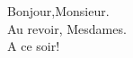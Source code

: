 \documentclass[../templates/main]{subfiles}
\begin{document}
\begin{sentence}
  Bonjour,Monsieur.\\
  Au revoir, Mesdames.\\
  A ce soir!
\end{sentence}
\end{document}
